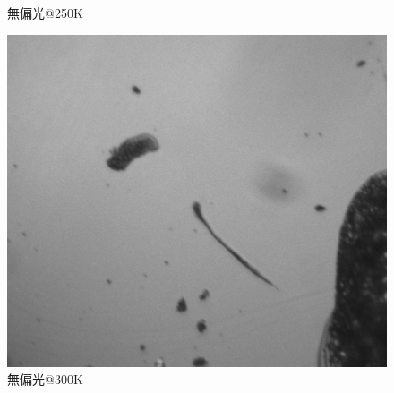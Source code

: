 \begin{figure}[htb]
\begin{minipage}{0.333\hsize}
\begin{center}
  \end{center}
  \caption{無偏光@250K}
  \label{fig:nonpol250_2}
 \end{minipage}
 \begin{minipage}{0.333\hsize}
  \begin{center}
   \includegraphics[width=\hsize]{nonpol300_2.eps}
  \end{center}
  \caption{無偏光@300K}
  \label{fig:nonpol300_2}
 \end{minipage}
\end{figure}

